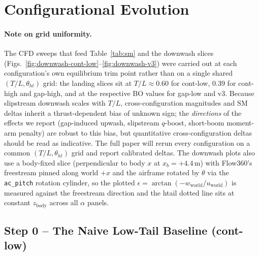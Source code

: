 \documentclass[conf]{new-aiaa}
\newcommand{\sm}{\mathrm{SM}}
\begin{document}
\section{Configurational Evolution}
\label{sec:evolution}

\paragraph{\textbf{Note on grid uniformity.}}
\label{sec:caveats}
The CFD sweeps that feed Table~\ref{tab:sm} and the downwash
slices (Figs.~\ref{fig:downwash-cont-low}--\ref{fig:downwash-v3})
were carried out at each configuration's own equilibrium trim
point rather than on a single shared $(T/L, \theta_{ht})$
grid: the landing slices sit at $T/L\approx 0.60$ for cont-low,
$0.39$ for cont-high and gap-high, and at the respective BO
values for gap-low and v3.  Because slipstream downwash scales
with $T/L$, cross-configuration magnitudes and $\sm$ deltas
inherit a thrust-dependent bias of unknown sign; the
\emph{directions} of the effects we report (gap-induced
upwash, slipstream $q$-boost, short-boom moment-arm penalty)
are robust to this bias, but quantitative cross-configuration
deltas should be read as indicative.  The full paper will rerun
every configuration on a common $(T/L, \theta_{ht})$ grid and
report calibrated deltas.  The downwash plots also use a
body-fixed slice (perpendicular to body $x$ at
$x_b{=}+4.4\,$m) with Flow360's freestream pinned along world
$+x$ and the airframe rotated by $\theta$ via the
\texttt{ac\_pitch} rotation cylinder, so the plotted
$\epsilon=\arctan(-w_\mathrm{world}/u_\mathrm{world})$ is
measured against the freestream direction and the htail dotted
line sits at constant $z_\mathrm{body}$ across all $\alpha$
panels.

\subsection{Step 0 -- The Naive Low-Tail Baseline (cont-low)}
\end{document}
